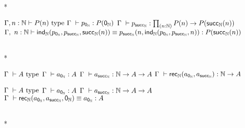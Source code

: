 \documentclass[12pt,oneside]{memoir}
\begin{document}
\begin{samepage}
\begin{center}
\begin{minipage}{.49\textwidth}
\begin{prooftree}
            \end{prooftree}
        \end{minipage}
        \\*
        \bigskip%
        \begin{minipage}{\textwidth}
            \begin{prooftree}
                \def\fCenter{\Gamma}
                \Axiom$\fCenter, n:\N \vdash P(n)~\type$
                \noLine%
                \UnaryInf$\fCenter\ \vdash p_{\zeroN} :P(\zeroN)$
                \noLine%
                \UnaryInf$\fCenter\ \vdash p_{\succN}:\prod_{(n:\N)}P(n)\to P(\succN(n))$
                \UnaryInf$\fCenter,\ n:\N \vdash \ind{\N}(p_{\zeroN},p_{\succN}, \succN(n)) \equiv p_{\succN}(n, \ind{\N}(p_{\zeroN}, p_{\succN}, n)) : P(\succN(n))$
            \end{prooftree}
        \end{minipage}
        \\*
        \bigskip%
        \begin{minipage}{0.39\textwidth}
            \begin{prooftree}
                \def\fCenter{\Gamma}
                \Axiom$\fCenter\ \vdash A~\type$
                \noLine%
                \UnaryInf$\fCenter\ \vdash a_{\zeroN} : A$
                \noLine%
                \UnaryInf$\fCenter\ \vdash a_{\succN}: \N \to A \to A$
                \UnaryInf$\fCenter\  \vdash \rec{\N} (a_{\zeroN}, a_{\succN}) : \N \to A$
            \end{prooftree}
        \end{minipage}
        \begin{minipage}{0.49\textwidth}
            \begin{prooftree}
                \def\fCenter{\Gamma}
                \Axiom$\fCenter\ \vdash A~\type$
                \noLine%
                \UnaryInf$\fCenter\ \vdash a_{\zeroN} : A$
                \noLine%
                \UnaryInf$\fCenter\ \vdash a_{\succN}: \N \to A \to A$
                \UnaryInf$\fCenter\  \vdash \rec{\N} (a_{\zeroN}, a_{\succN}, \zeroN) \equiv a_{\zeroN} : A$
                \noLine%
            \end{prooftree}
        \end{minipage}
        \\*
        \bigskip%
        \begin{minipage}{\textwidth}
            \begin{prooftree}

\end{prooftree}
\end{minipage}
\end{center}
\end{samepage}
\end{document}
